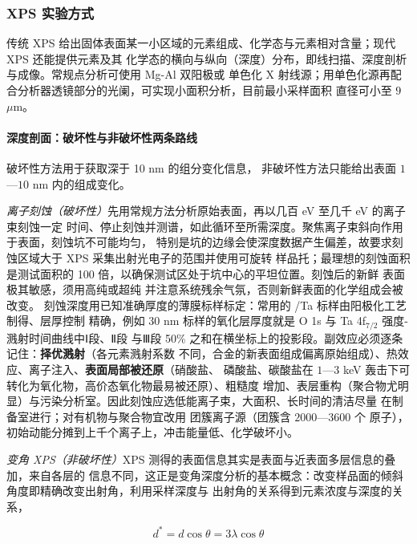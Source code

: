 \subsubsection{XPS 实验方式}

传统 XPS 给出固体表面某一小区域的元素组成、化学态与元素相对含量；现代 XPS 还能提供元素及其
化学态的横向与纵向（深度）分布，即线扫描、深度剖析与成像。常规点分析可使用 Mg-Al 双阳极或
单色化 X 射线源；用单色化源再配合分析器透镜部分的光阑，可实现小面积分析，目前最小采样面积
直径可小至 $9$ $\mu$m。

\paragraph{深度剖面：破坏性与非破坏性两条路线}破坏性方法用于获取深于 10 nm 的组分变化信息，
非破坏性方法只能给出表面 $1$—$10$ nm 内的组成变化。

\emph{离子刻蚀（破坏性）}先用常规方法分析原始表面，再以几百 eV 至几千 eV 的离子束刻蚀一定
时间、停止刻蚀并测谱，如此循环至所需深度。聚焦离子束斜向作用于表面，刻蚀坑不可能均匀，
特别是坑的边缘会使深度数据产生偏差，故要求刻蚀区域大于 XPS 采集出射光电子的范围并使用可旋转
样品托；最理想的刻蚀面积是测试面积的 100 倍，以确保测试区处于坑中心的平坦位置。刻蚀后的新鲜
表面极其敏感，须用高纯或超纯  并注意系统残余气氛，否则新鲜表面的化学组成会被改变。
刻蚀深度用已知准确厚度的薄膜标样标定：常用的 /Ta 标样由阳极化工艺制得、层厚控制
精确，例如 $30$ nm 标样的氧化层厚度就是 O 1s 与 Ta 4f$_{7/2}$ 强度-溅射时间曲线中Ⅰ段、Ⅱ段
与Ⅲ段 50\% 之和在横坐标上的投影段。副效应必须逐条记住：\textbf{择优溅射}（各元素溅射系数
不同，合金的新表面组成偏离原始组成）、热效应、离子注入、\textbf{表面局部被还原}（硝酸盐、
磷酸盐、碳酸盐在 $1$—$3$ keV  轰击下可转化为氧化物，高价态氧化物最易被还原）、粗糙度
增加、表层重构（聚合物尤明显）与污染分析室。因此刻蚀应选低能离子束，大面积、长时间的清洁尽量
在制备室进行；对有机物与聚合物宜改用  团簇离子源（团簇含 $2000$—$3600$ 个 
原子），初始动能分摊到上千个离子上，冲击能量低、化学破坏小。

\emph{变角 XPS（非破坏性）}XPS 测得的表面信息其实是表面与近表面多层信息的叠加，来自各层的
信息不同，这正是变角深度分析的基本概念：改变样品面的倾斜角度即精确改变出射角，利用采样深度与
出射角的关系得到元素浓度与深度的关系，

\begin{equation}\label{eq:arxps}
d^{*}=d\cos\theta=3\lambda\cos\theta
\end{equation}

